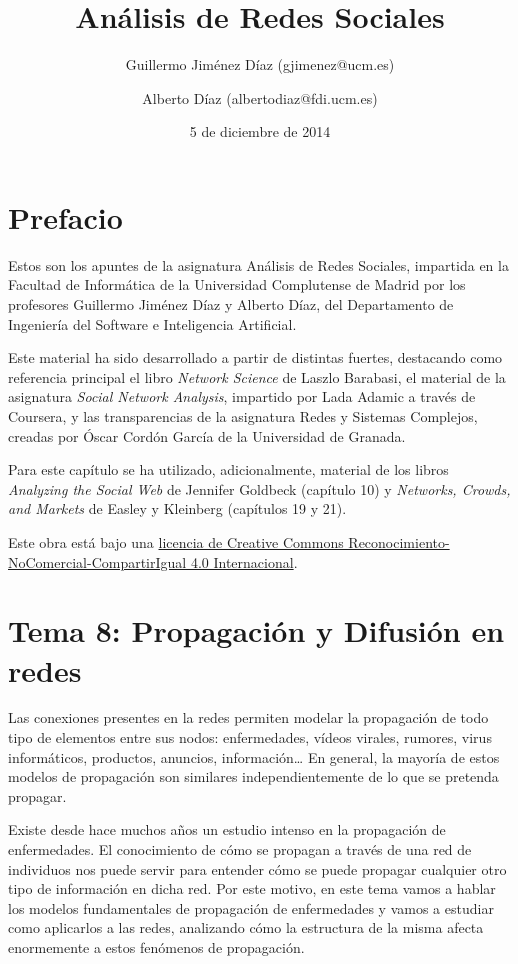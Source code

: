 \documentclass[]{article}
\title{Análisis de Redes Sociales}
\author{Guillermo Jiménez Díaz (gjimenez@ucm.es) \and Alberto Díaz (albertodiaz@fdi.ucm.es)}
\date{5 de diciembre de 2014}
\begin{document}
\maketitle

\section*{Prefacio}\label{prefacio}

Estos son los apuntes de la asignatura Análisis de Redes Sociales,
impartida en la Facultad de Informática de la Universidad Complutense de
Madrid por los profesores Guillermo Jiménez Díaz y Alberto Díaz, del
Departamento de Ingeniería del Software e Inteligencia Artificial.

Este material ha sido desarrollado a partir de distintas fuertes,
destacando como referencia principal el libro \emph{Network Science} de
Laszlo Barabasi, el material de la asignatura \emph{Social Network
Analysis}, impartido por Lada Adamic a través de Coursera, y las
transparencias de la asignatura Redes y Sistemas Complejos, creadas por
Óscar Cordón García de la Universidad de Granada.

Para este capítulo se ha utilizado, adicionalmente, material de los
libros \emph{Analyzing the Social Web} de Jennifer Goldbeck (capítulo
10) y \emph{Networks, Crowds, and Markets} de Easley y Kleinberg
(capítulos 19 y 21).

Este obra está bajo una
\href{http://creativecommons.org/licenses/by-nc-sa/4.0/}{licencia de
Creative Commons Reconocimiento-NoComercial-CompartirIgual 4.0
Internacional}.

\setcounter{section}{8}

\section*{Tema 8: Propagación y Difusión en
redes}\label{tema-8-propagaciuxf3n-y-difusiuxf3n-en-redes}

Las conexiones presentes en la redes permiten modelar la propagación de
todo tipo de elementos entre sus nodos: enfermedades, vídeos virales,
rumores, virus informáticos, productos, anuncios, información\ldots{} En
general, la mayoría de estos modelos de propagación son similares
independientemente de lo que se pretenda propagar.

Existe desde hace muchos años un estudio intenso en la propagación de
enfermedades. El conocimiento de cómo se propagan a través de una red de
individuos nos puede servir para entender cómo se puede propagar
cualquier otro tipo de información en dicha red. Por este motivo, en
este tema vamos a hablar los modelos fundamentales de propagación de
enfermedades y vamos a estudiar como aplicarlos a las redes, analizando
cómo la estructura de la misma afecta enormemente a estos fenómenos de
propagación.
\end{document}
